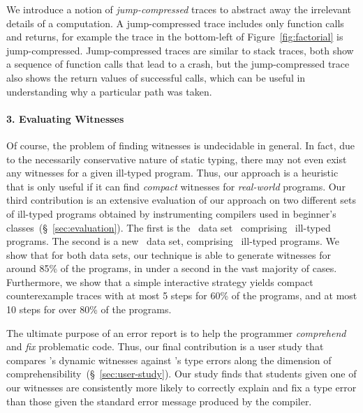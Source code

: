We introduce a notion of \emph{jump-compressed} traces to abstract away
the irrelevant details of a computation.
%
A jump-compressed trace includes only function
calls and returns, for example the trace in the bottom-left of
Figure~\ref{fig:factorial} is jump-compressed.
%
Jump-compressed traces are similar to stack traces, both show a
sequence of function calls that lead to a crash, but the jump-compressed
trace also shows the return values of successful calls, which can be
useful in understanding why a particular path was taken.

\paragraph{3. Evaluating Witnesses}
%
Of course, the problem of finding witnesses is
undecidable in general. In fact, due to the necessarily
conservative nature of static typing, there
may not even exist any witnesses for a given
ill-typed program.
%
Thus, our approach is a heuristic that is only useful
if it can find \emph{compact} witnesses for
\emph{real-world} programs.
%
Our third contribution is an extensive evaluation of our approach
on two different sets of ill-typed programs obtained by instrumenting
compilers used in beginner's classes~(\S~\ref{sec:evaluation}).
%
The first is the \uwbench\ data set~\cite{Lerner2007-dt}
comprising \uwsize\ ill-typed programs.
%
The second is a new \ucsdbench\ data set, comprising \ucsdsize\
ill-typed programs.
%
We show that for both data sets, our technique is able to generate
witnesses for around 85\% of the programs, in under a second in the
vast majority of cases.
%
Furthermore, we show that a simple interactive strategy yields
compact counterexample traces with at most 5 steps for 60\%
of the programs, and at most 10 steps for over 80\% of the programs.

The ultimate purpose of an error report is to help the programmer
\emph{comprehend} and \emph{fix} problematic code.
%
Thus, our final contribution is a user study that compares \toolname's
dynamic witnesses against \ocaml's type errors along the dimension of
comprehensibility~(\S~\ref{sec:user-study}).
%
Our study finds that students given one of our witnesses are
consistently more likely to correctly explain and fix a type
error than those given the standard error message produced by
the \ocaml compiler.


%
%
%
%
%
%

